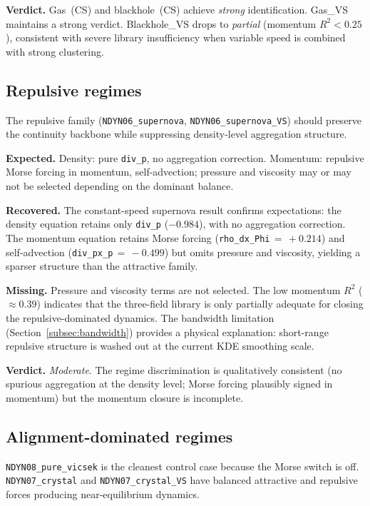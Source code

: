 \noindent\textbf{Verdict.}
Gas~(CS) and blackhole~(CS) achieve \emph{strong} identification.
Gas\_VS maintains a strong verdict.  Blackhole\_VS drops to \emph{partial}
(momentum $R^2 < 0.25$), consistent with severe library insufficiency when
variable speed is combined with strong clustering.

\subsection{Repulsive regimes}
\label{subsec:interp_repulsive}

The repulsive family (\texttt{NDYN06\_supernova},
\texttt{NDYN06\_supernova\_VS}) should preserve the continuity backbone
while suppressing density-level aggregation structure.

\noindent\textbf{Expected.}
Density: pure \texttt{div\_p}, no aggregation correction.
Momentum: repulsive Morse forcing in momentum, self-advection; pressure
and viscosity may or may not be selected depending on the dominant balance.

\noindent\textbf{Recovered.}
The constant-speed supernova result confirms expectations: the density
equation retains only \texttt{div\_p} ($-0.984$), with no aggregation
correction.  The momentum equation retains Morse forcing
(\texttt{rho\_dx\_Phi}${}\,=\,+0.214$) and self-advection
(\texttt{div\_px\_p}${}\,=\,-0.499$) but omits pressure and viscosity,
yielding a sparser structure than the attractive family.

\noindent\textbf{Missing.}
Pressure and viscosity terms are not selected.  The low momentum $R^2$
($\approx 0.39$) indicates that the three-field library is only partially
adequate for closing the repulsive-dominated dynamics.  The
bandwidth limitation (Section~\ref{subsec:bandwidth}) provides a physical
explanation: short-range repulsive structure is washed out at the current
KDE smoothing scale.

\noindent\textbf{Verdict.}
\emph{Moderate}.  The regime discrimination is qualitatively consistent (no spurious
aggregation at the density level; Morse forcing plausibly signed in
momentum) but the momentum closure is incomplete.

\subsection{Alignment-dominated regimes}
\label{subsec:interp_alignment}

\texttt{NDYN08\_pure\_vicsek} is the cleanest control case because the
Morse switch is off.  \texttt{NDYN07\_crystal} and
\texttt{NDYN07\_crystal\_VS} have balanced attractive and repulsive forces
producing near-equilibrium dynamics.

